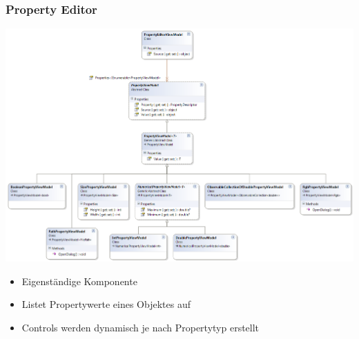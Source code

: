 \documentclass[t]{beamer}
\begin{document}
\begin{frame}
\frametitle{Property Editor}
\noindent
\begin{minipage}{6cm}
\includegraphics[height=0.9\textheight]{../YuvKA.ViewModel.PropertyEditor/propertyEditor.png}
\end{minipage}
\hfill
\begin{minipage}{5cm}
    \vspace{-2cm} %
    \begin{itemize}
        \item Eigenständige Komponente
        \item Listet Propertywerte eines Objektes auf
        \item Controls werden dynamisch je nach Propertytyp erstellt
    \end{itemize}
\end{minipage}
\end{frame}
\end{document}

